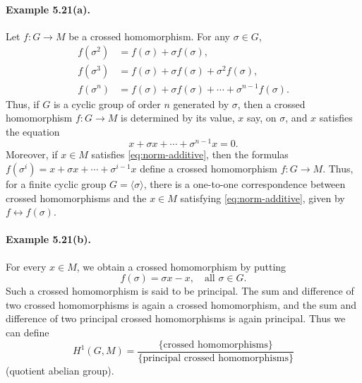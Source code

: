\documentclass[UTF8,11pt,a4paper]{ctexart}
\theoremstyle{definition}\newtheorem*{definition}{Definition}
\theoremstyle{remark}\newtheorem*{remark}{Remark}
\begin{document}
\paragraph{Example 5.21(a).}
Let $f:G\to M$ be a crossed homomorphism. For any $\sigma\in G$,
\begin{align*}
f(\sigma^2)&=f(\sigma)+\sigma f(\sigma),\\
f(\sigma^3)&=f(\sigma)+\sigma f(\sigma)+\sigma^2 f(\sigma),\\
f(\sigma^n)&=f(\sigma)+\sigma f(\sigma)+\cdots+\sigma^{n-1}f(\sigma).
\end{align*}
Thus, if $G$ is a cyclic group of order $n$ generated by $\sigma$, then a crossed homomorphism $f:G\to M$ is determined by its value, $x$ say, on $\sigma$, and $x$ satisfies the equation
\begin{equation}\label{eq:norm-additive}
x+\sigma x+\cdots+\sigma^{n-1}x=0.
\end{equation}
Moreover, if $x\in M$ satisfies \eqref{eq:norm-additive}, then the formulas
$f(\sigma^i)=x+\sigma x+\cdots+\sigma^{i-1}x$ define a crossed homomorphism $f:G\to M$. Thus, for a finite cyclic group $G=\langle\sigma\rangle$, there is a one-to-one correspondence between crossed homomorphisms and the $x\in M$ satisfying \eqref{eq:norm-additive}, given by $f\leftrightarrow f(\sigma)$.

\paragraph{Example 5.21(b).}
For every $x\in M$, we obtain a crossed homomorphism by putting
\[
f(\sigma)=\sigma x-x,\quad\text{all }\sigma\in G.
\]
Such a crossed homomorphism is said to be principal. The sum and difference of two crossed homomorphisms is again a crossed homomorphism, and the sum and difference of two principal crossed homomorphisms is again principal. Thus we can define
\[
H^1(G,M)=\frac{\{\text{crossed homomorphisms}\}}{\{\text{principal crossed homomorphisms}\}}
\]
(quotient abelian group).
\end{document}
